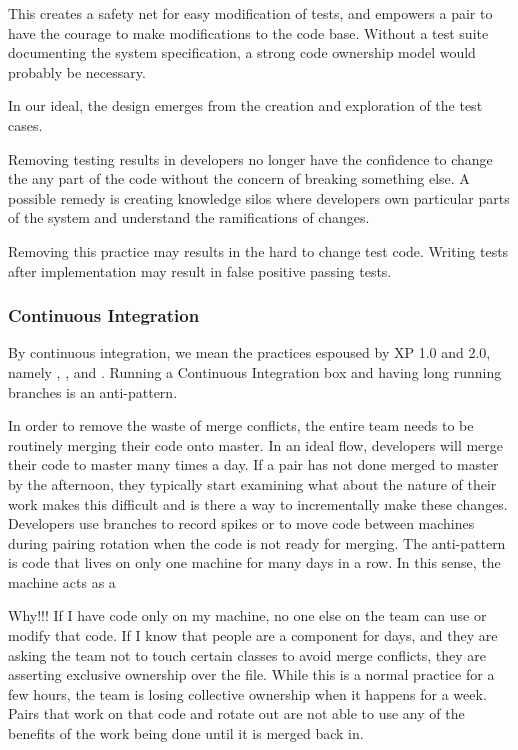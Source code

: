 This creates a safety net for easy modification of tests, and empowers a pair to have the courage to make modifications to the code base. Without a test suite documenting the system specification, a strong code ownership model would probably be necessary.

In our ideal, the design emerges from the creation and exploration of the test cases.  

Removing testing results in developers no longer have the confidence to change the any part of the code without the concern of  breaking something else. A possible remedy is creating knowledge silos where developers own particular parts of the system and understand the ramifications of changes.

Removing this practice may results in the hard to change test code. Writing tests after implementation may result in false positive passing tests.

\subsubsection{Continuous Integration}
By continuous integration, we mean the practices espoused by XP 1.0 and 2.0, namely , , and . Running a Continuous Integration box and having long running branches is an anti-pattern.

In order to remove the waste of merge conflicts, the entire team needs to be routinely merging their code onto master.  In an ideal flow, developers will merge their code to master many times a day. If a pair has not done merged to master by the afternoon, they typically start examining what about the nature of their work makes this difficult and is there a way to incrementally make these changes. Developers use branches to record spikes or to move code between machines during pairing rotation when the code is not ready for merging.  The anti-pattern is code that lives on only one machine for many days in a row. In this sense, the machine acts as a  

Why!!! If I have code only on my machine, no one else on the team can use or modify that code. If I know that people are  a component for days, and they are asking the team not to touch certain classes to avoid merge conflicts, they are asserting exclusive ownership over the file. While this is a normal practice for a few hours, the team is losing collective ownership when it happens for a week. Pairs that work on that code and rotate out are not able to use any of the benefits of the work being done until it is merged back in. 

